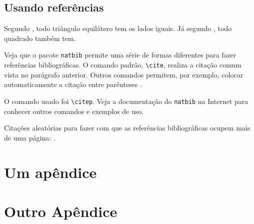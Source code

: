 \documentclass[
	msc, %
	english %
]{ppgccufmg}
\begin{document}
		\section{Usando referências}
			Segundo \cite{horn86robot}, todo triângulo equilátero tem os lados iguais. Já segundo \cite{shashua97photometric}, todo quadrado também tem.
			
			Veja que o pacote \verb|natbib| permite uma série de formas diferentes para fazer referências bibliográficas. O comando padrão, \verb|\cite|, realiza a citação comum vista no parágrafo anterior. Outros comandos permitem, por exemplo, colocar automaticamente a citação entre	parênteses \citep{hougen93estimation, sato99illumination2, sato99illumination1, sato01stability}.
			
			O comando usado foi \verb|\citep|. Veja a documentação do \verb|natbib| na Internet para conhecer	outros comandos e exemplos de uso.
			
			Citações aleatórias para fazer com que as referências bibliográficas ocupem	mais de uma página: \cite{bichsel92simple, dror01statistics, guisser92new, dwork2006calibrating, sweeney2002k}.
			
		
		
		
		\begin{apendices}
			\chapter{Um apêndice}
				\lipsum[1-3]
				
			\chapter{Outro Apêndice}
				\lipsum[4-6]
				
		\end{apendices}
		
\end{document}
